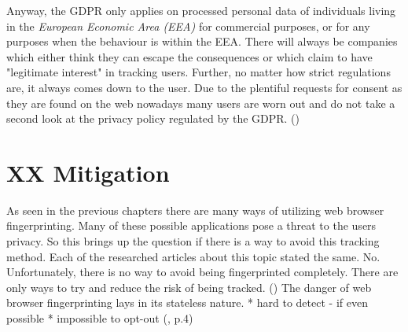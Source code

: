 Anyway, the GDPR only applies on processed personal data of individuals living in the \textit{European Economic Area (EEA)} for commercial purposes, or for any purposes when the behaviour is within the EEA. There will always be companies which either think they can escape the consequences or which claim to have "legitimate interest" in tracking users. Further, no matter how strict regulations are, it always comes down to the user. Due to the plentiful requests for consent as they are found on the web nowadays many users are worn out and do not take a second look at the privacy policy regulated by the GDPR. (\textcite{miele18})

\section{XX Mitigation}
As seen in the previous chapters there are many ways of utilizing web browser fingerprinting. Many of these possible applications pose a threat to the users privacy. So this brings up the question if there is a way to avoid this tracking method. Each of the researched articles about this topic stated the same. No. Unfortunately, there is no way to avoid being fingerprinted completely. There are only ways to try and reduce the risk of being tracked. (\textcite{web17})
The danger of web browser fingerprinting lays in its stateless nature. 
* hard to detect - if even possible
* impossible to opt-out
(\textcite{upi15}, p.4)
 \\\\
